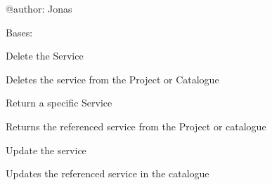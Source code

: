\documentclass[letterpaper,10pt,english]{sphinxmanual}
\begin{document}
@author: Jonas

\begin{fulllineitems}
\label{_source/son_editor.apis:son_editor.apis.catalogue_servicesapi.Service}
Bases: 

\begin{fulllineitems}
\label{_source/son_editor.apis:son_editor.apis.catalogue_servicesapi.Service.delete}
Delete the Service

Deletes the service from the Project or Catalogue

\end{fulllineitems}


\begin{fulllineitems}
\label{_source/son_editor.apis:son_editor.apis.catalogue_servicesapi.Service.get}
Return a specific Service

Returns the referenced service from the Project or catalogue

\end{fulllineitems}


\begin{fulllineitems}
\label{_source/son_editor.apis:son_editor.apis.catalogue_servicesapi.Service.methods}
\end{fulllineitems}


\begin{fulllineitems}
\label{_source/son_editor.apis:son_editor.apis.catalogue_servicesapi.Service.put}
Update the service

Updates the referenced service in the catalogue

\end{fulllineitems}


\end{fulllineitems}
\end{document}

